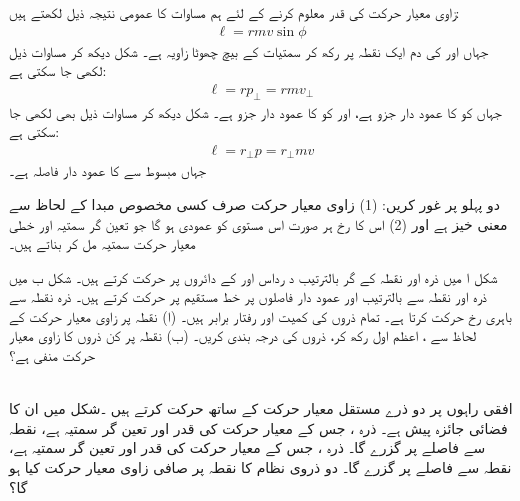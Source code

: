  \quad
     زاوی معیار حرکت   کی قدر  معلوم  کرنے کے لئے ہم   مساوات  کا عمومی نتیجہ  ذیل لکھتے ہیں:
 \begin{align}\label{مساوات_لڑھکاو_زاوی_قدر_معیار_حرکت}
 \ell=rmv\sin\phi
 \end{align}
 جہاں  اور   کی دم ایک نقطہ پر رکھ کر  سمتیات کے بیچ چھوٹا زاویہ  ہے۔ شکل  دیکھ کر مساوات  ذیل لکھی جا سکتی ہے:
 \begin{align}\label{مساوات_لڑھکاو_زاوی_قدر_معیار_حرکت_دوم}
 \ell=rp_{\perp}=rmv_{\perp}
 \end{align}
 جہاں  کو   کا عمود دار  جزو  ہے، اور   کو   کا عمود دار  جزو  ہے۔ شکل  دیکھ کر مساوات  ذیل بھی لکھی جا سکتی ہے:
 \begin{align}\label{مساوات_لڑھکاو_سمتیہ_زاوی_قوت_مروڑ_چہارم}
 \ell=r_{\perp}p=r_{\perp}mv
 \end{align}
 جہاں مبسوط     سے  کا  عمود دار فاصلہ  ہے۔
 
 \quad
 دو  پہلو پر غور کریں: (1)  زاوی معیار حرکت صرف  کسی مخصوص مبدا کے لحاظ سے معنی خیز ہے اور (2)  اس کا رخ ہر صورت اس مستوی کو عمودی ہو گا جو   تعین گر سمتیہ  اور  خطی معیار حرکت  سمتیہ   مل کر بناتے ہیں۔
 
 شکل     ا میں  ذرہ  اور  نقطہ  کے گر بالترتیب د رداس  اور  کے دائروں پر حرکت کرتے ہیں۔ شکل ب میں ذرہ  اور   نقطہ  سے بالترتیب   اور   عمود دار فاصلوں پر  خط مستقیم پر حرکت کرتے ہیں۔ ذرہ  نقطہ  سے باہری رخ حرکت کرتا ہے۔ تمام  ذروں کی کمیت اور رفتار برابر ہیں۔ (ا)  نقطہ  پر زاوی معیار حرکت کے لحاظ سے ، اعظم اول رکھ کر، ذروں کی درجہ بندی کریں۔ (ب)  نقطہ  پر کن ذروں کا زاوی معیار حرکت منفی ہے؟
 
 \\
 افقی راہوں پر  دو ذرے مستقل معیار حرکت  کے ساتھ  حرکت کرتے ہیں ۔شکل  میں ان کا فضائی جائزہ پیش ہے۔ ذرہ  ، جس کے معیار حرکت کی قدر  اور تعین گر سمتیہ  ہے، نقطہ  سے   فاصلے پر گزرے گا۔  ذرہ  ، جس کے معیار حرکت کی قدر  اور تعین گر 
 سمتیہ  ہے، نقطہ  سے   فاصلے پر گزرے گا۔ دو ذروی نظام کا نقطہ  پر صافی زاوی معیار حرکت  کیا ہو گا؟
 

